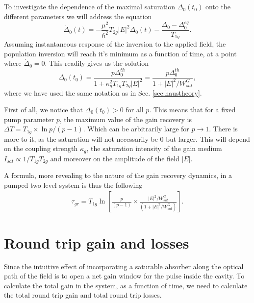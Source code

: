 \documentclass[preprint,secnumarabic,amssymb, nobibnotes, aip, prd]{revtex4-1}
\begin{document}
\subsection{}
To investigate the dependence of the maximal saturation $\Delta_0(t_0)$ onto the different parameters we will address the equation
\begin{equation}
\label{eq:inversion3}
\dot\Delta_0(t) = -\frac{\mu^2}{\hbar^2}T_{2g} |E|^2\Delta_0(t) -\frac{\Delta_0-\Delta_0^{eq}}{T_{1g}}.
\end{equation}
Assuming instantaneous response of the inversion to the applied field, the population inversion will reach it's minimum as a function of time, at a point where $\dot\Delta_0 = 0$. This readily gives us the solution
\begin{equation}
\label{eq:saturation}
\Delta_0(t_0) =  \frac{ p\Delta_0^{th}}{1+\kappa_g^2T_{1g}T_{2g}|E|^2} = \frac{ p\Delta_0^{th}}{1+|E|^2/W_{sat}^G} ,
\end{equation} 
where we have used the same notation as in Sec. \ref{sec:haustheory}.


First of all, we notice that $\Delta_0(t_0) >0$ for all $p$. This means that for a fixed pump parameter $p$, the maximum value of the gain recovery is $\Delta T= T_{1g}\times\ln p/(p-1)$. Which can be arbitrarily large for $p\to 1$. There is more to it, as the saturation will not necessarily be 0 but larger. This will depend on the coupling strength $\kappa_g$, the saturation intensity of the gain medium $I_{sat}\propto 1/T_{1g}T_{2g}$ and moreover on the amplitude of the field $|E|$.

A formula, more revealing to the nature of the gain recovery dynamics, in a pumped two level system is thus the following
\begin{align}
\label{eq:gainrecovery2}
\tau_{gr} = T_{1g} \ln\left[\frac{p}{\left(p-1\right)}\times\frac{|E|^2/W_{sat}^G}{\left (1+|E|^2/W_{sat}^G\right)}\right].
\end{align}

\section{Round trip gain and losses}

Since the intuitive effect of incorporating a saturable absorber along the optical path of the field is to open a net gain window for the pulse inside the cavity. To calculate the total gain in the system, as a function of time, we need to calculate the total round trip gain and total round trip losses. 
\end{document}
